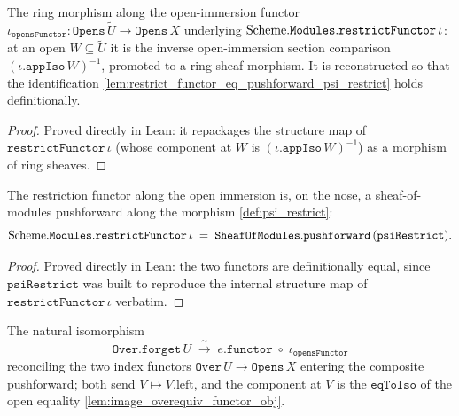 \begin{definition}\leanok
  \label{def:psi_restrict}
  The ring morphism along the open-immersion functor
  \(\iota_{\mathtt{opensFunctor}} : \mathtt{Opens}\,\widetilde{U} \to
  \mathtt{Opens}\,X\) underlying \(\mathrm{Scheme}.\mathtt{Modules.restrictFunctor}\,\iota\):
  at an open \(W \subseteq \widetilde{U}\) it is the inverse open-immersion section
  comparison \((\iota.\mathtt{appIso}\,W)^{-1}\), promoted to a ring-sheaf morphism.
  It is reconstructed so that the identification
  \cref{lem:restrict_functor_eq_pushforward_psi_restrict} holds definitionally.
\end{definition}

\begin{proof}

\leanok
  Proved directly in Lean: it repackages the structure map of
  \(\mathtt{restrictFunctor}\,\iota\) (whose component at \(W\) is
  \((\iota.\mathtt{appIso}\,W)^{-1}\)) as a morphism of ring sheaves.
\end{proof}

\begin{lemma}\leanok
  \label{lem:restrict_functor_eq_pushforward_psi_restrict}
  The restriction functor along the open immersion is, on the nose, a sheaf-of-modules
  pushforward along the morphism \cref{def:psi_restrict}:
  \[
    \mathrm{Scheme}.\mathtt{Modules.restrictFunctor}\,\iota
      \;=\; \mathtt{SheafOfModules.pushforward}\,(\mathtt{psiRestrict}).
  \]
\end{lemma}

\begin{proof}
  \leanok
  Proved directly in Lean: the two functors are definitionally equal, since
  \(\mathtt{psiRestrict}\) was built to reproduce the internal structure map of
  \(\mathtt{restrictFunctor}\,\iota\) verbatim.
\end{proof}

\begin{definition}\leanok
  \label{def:over_forget_nat_iso}
  The natural isomorphism
  \[
    \mathtt{Over.forget}\,U \;\xrightarrow{\ \sim\ }\;
      e.\mathtt{functor} \;\circ\; \iota_{\mathtt{opensFunctor}}
  \]
  reconciling the two index functors \(\mathtt{Over}\,U \to \mathtt{Opens}\,X\)
  entering the composite pushforward; both send \(V \mapsto V.\mathrm{left}\), and the
  component at \(V\) is the \(\mathtt{eqToIso}\) of the open equality
  \cref{lem:image_overequiv_functor_obj}.
\end{definition}

